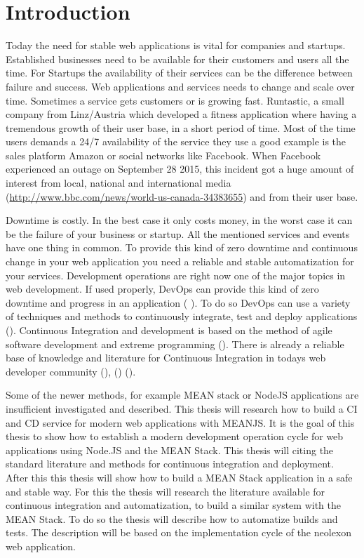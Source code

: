 \section{Introduction}
Today the need for stable web applications is vital for companies and startups. Established businesses need to be
available for their customers and users all the time. For Startups the availability of their services can be the difference
between failure and success. Web applications and services needs to change and scale over time. Sometimes a service gets customers or is
growing fast. Runtastic, a small company from Linz/Austria which developed a fitness application where having a tremendous growth of
their user base, in a short period of time. Most of the time users demands a 24/7 availability of the service they use a good example
is the sales platform Amazon or social networks like Facebook. When Facebook experienced an outage on September 28 2015, this incident
got a huge amount of interest from local, national and international media (\url{http://www.bbc.com/news/world-us-canada-34383655}) and
from their user base.

Downtime is costly. In the best case it only costs money, in the worst case
it can be the failure of your business or startup. All the mentioned services and events have one thing in common. To provide this kind of zero
downtime and continuous change in your web application you need a reliable and stable automatization for your services. Development operations are
right now one of the major topics in web development. If used properly, DevOps can provide this kind of zero downtime and progress in an application
(\cite{humble2010continuous} \cite{duvall2007continuous}). To do so DevOps can use a variety of techniques and methods to continuously
integrate, test and deploy applications (\cite{meyer2014continuous}).
Continuous Integration and development is based on the method of agile software development and extreme programming
(\cite{lindstrom2004extreme}). There is already a reliable base of knowledge and literature for Continuous Integration in todays web developer community
(\cite{schaefer2013continuous}), (\cite{fowler2006continuous}) (\cite{fowler2012continuous}).

Some of the newer methods, for example MEAN stack or NodeJS applications are insufficient investigated and described.
This thesis will research how to build a CI and CD service for modern web applications with MEANJS.
It is the goal of this thesis to show how to establish a modern development operation cycle for web applications using Node.JS and the MEAN Stack.
This thesis will citing the standard literature and methods for continuous integration and deployment. After this this thesis will
show how to build a MEAN Stack application in a safe and stable way.
For this the thesis will research the literature available for continuous integration and automatization, to build a similar system with the MEAN Stack.
To do so the thesis will describe how to automatize builds and tests. The description will be based on the implementation cycle of the neolexon web application.

